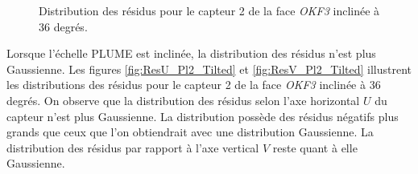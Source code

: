   \medskip
  
  \begin{figure}[htb!]
     \begin{center}
     \end{center}
     \caption{Distribution des r\'esidus pour le capteur 2 de la face \textit{OKF3} inclinée \`a 36 degr\'es.}
     \label{fig:Pl2Tilted}
  \end{figure}
  
  Lorsque l'\'echelle PLUME est inclin\'ee, la distribution des r\'esidus n'est plus Gaussienne. Les figures \ref{fig:ResU_Pl2_Tilted} et \ref{fig:ResV_Pl2_Tilted} illustrent les distributions des r\'esidus pour le capteur 2 de la face \textit{OKF3} inclin\'ee \`a 36 degr\'es. On observe que la distribution des r\'esidus selon l'axe horizontal $U$ du capteur n'est plus Gaussienne. La distribution poss\`ede des r\'esidus n\'egatifs plus grands que ceux que l'on obtiendrait avec une distribution Gaussienne. La distribution des r\'esidus par rapport \`a l'axe vertical $V$ reste quant \`a elle Gaussienne.
  
  \medskip
  

